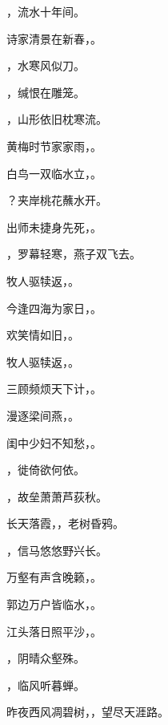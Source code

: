 \documentclass[12pt, a4paper, addpoints]{exam}
\begin{document}
\begin{questions}
\question[1] \uline{\qquad\qquad\qquad}，流水十年间。

\question[1] 诗家清景在新春，\uline{\qquad\qquad\qquad}。

\question[1] \uline{\qquad\qquad\qquad}，水寒风似刀。

\question[1] \uline{\qquad\qquad\qquad}，缄恨在雕笼。

\question[1] \uline{\qquad\qquad\qquad}，山形依旧枕寒流。

\question[1] 黄梅时节家家雨，\uline{\qquad\qquad\qquad}。

\question[1] 白鸟一双临水立，\uline{\qquad\qquad\qquad}。

\question[1] \uline{\qquad\qquad\qquad}？夹岸桃花蘸水开。

\question[1] 出师未捷身先死，\uline{\qquad\qquad\qquad}。

\question[1] \uline{\qquad\qquad\qquad}，罗幕轻寒，燕子双飞去。

\question[1] 牧人驱犊返，\uline{\qquad\qquad\qquad}。

\question[1] 今逢四海为家日，\uline{\qquad\qquad\qquad}。

\question[1] 欢笑情如旧，\uline{\qquad\qquad\qquad}。

\question[1] 牧人驱犊返，\uline{\qquad\qquad\qquad}。

\question[1] 三顾频烦天下计，\uline{\qquad\qquad\qquad}。

\question[1] 漫逐梁间燕，\uline{\qquad\qquad\qquad}。

\question[1] 闺中少妇不知愁，\uline{\qquad\qquad\qquad}。

\question[1] \uline{\qquad\qquad\qquad}，徙倚欲何依。

\question[1] \uline{\qquad\qquad\qquad}，故垒萧萧芦荻秋。

\question[1] 长天落霞，\uline{\qquad\qquad\qquad}，老树昏鸦。

\question[1] \uline{\qquad\qquad\qquad}，信马悠悠野兴长。

\question[1] 万壑有声含晚籁，\uline{\qquad\qquad\qquad}。

\question[1] 郭边万户皆临水，\uline{\qquad\qquad\qquad}。

\question[1] 江头落日照平沙，\uline{\qquad\qquad\qquad}。

\question[1] \uline{\qquad\qquad\qquad}，阴晴众壑殊。

\question[1] \uline{\qquad\qquad\qquad}，临风听暮蝉。

\question[1] 昨夜西风凋碧树，\uline{\qquad\qquad\qquad}，望尽天涯路。


\end{questions}
\end{document}
